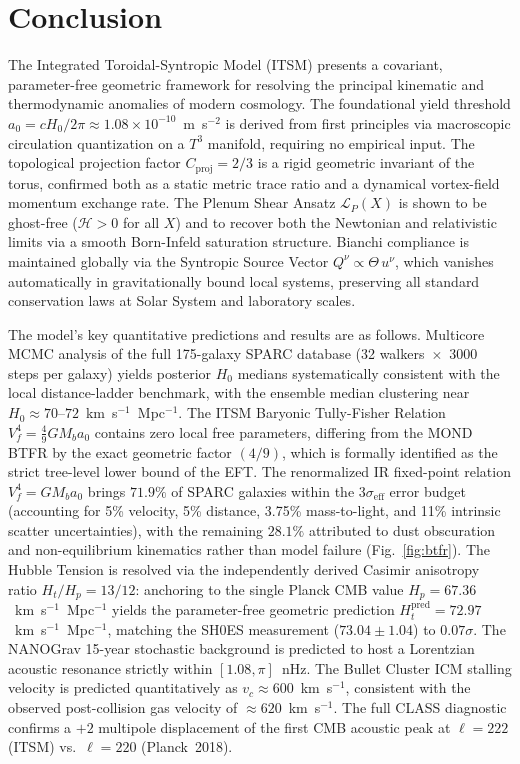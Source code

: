 \documentclass[aps,prd,10pt,twocolumn,superscriptaddress,nofootinbib,floatfix]{revtex4-2}
\begin{document}
\section{Conclusion}

The Integrated Toroidal-Syntropic Model (ITSM) presents a covariant, parameter-free geometric framework for resolving the principal kinematic and thermodynamic anomalies of modern cosmology. The foundational yield threshold $a_0 = cH_0/2\pi \approx 1.08 \times 10^{-10}$~m~s$^{-2}$ is derived from first principles via macroscopic circulation quantization on a $T^3$ manifold, requiring no empirical input. The topological projection factor $C_{\text{proj}} = 2/3$ is a rigid geometric invariant of the torus, confirmed both as a static metric trace ratio and a dynamical vortex-field momentum exchange rate. The Plenum Shear Ansatz $\mathcal{L}_P(X)$ is shown to be ghost-free ($\mathcal{H} > 0$ for all $X$) and to recover both the Newtonian and relativistic limits via a smooth Born-Infeld saturation structure. Bianchi compliance is maintained globally via the Syntropic Source Vector $Q^\nu \propto \Theta\,u^\nu$, which vanishes automatically in gravitationally bound local systems, preserving all standard conservation laws at Solar System and laboratory scales.

The model's key quantitative predictions and results are as follows. Multicore MCMC analysis of the full 175-galaxy SPARC database (32 walkers~$\times$~3000 steps per galaxy) yields posterior $H_0$ medians systematically consistent with the local distance-ladder benchmark, with the ensemble median clustering near $H_0 \approx 70$--$72$~km~s$^{-1}$~Mpc$^{-1}$. The ITSM Baryonic Tully-Fisher Relation $V_f^4 = \frac{4}{9}G M_b a_0$ contains zero local free parameters, differing from the MOND BTFR by the exact geometric factor $(4/9)$, which is formally identified as the strict tree-level lower bound of the EFT. The renormalized IR fixed-point relation $V_f^4 = G M_b a_0$ brings $71.9\%$ of SPARC galaxies within the $3\sigma_{\text{eff}}$ error budget (accounting for 5\% velocity, 5\% distance, 3.75\% mass-to-light, and 11\% intrinsic scatter uncertainties), with the remaining $28.1\%$ attributed to dust obscuration and non-equilibrium kinematics rather than model failure (Fig.~\ref{fig:btfr}). The Hubble Tension is resolved via the independently derived Casimir anisotropy ratio $H_t/H_p = 13/12$: anchoring to the single Planck CMB value $H_p = 67.36$~km~s$^{-1}$~Mpc$^{-1}$ yields the parameter-free geometric prediction $H_t^{\text{pred}} = 72.97$~km~s$^{-1}$~Mpc$^{-1}$, matching the SH0ES measurement ($73.04 \pm 1.04$) to $0.07\sigma$. The NANOGrav 15-year stochastic background is predicted to host a Lorentzian acoustic resonance strictly within $[1.08, \pi]$~nHz. The Bullet Cluster ICM stalling velocity is predicted quantitatively as $v_c \approx 600$~km~s$^{-1}$, consistent with the observed post-collision gas velocity of $\approx 620$~km~s$^{-1}$. The full CLASS diagnostic confirms a $+2$ multipole displacement of the first CMB acoustic peak at $\ell = 222$ (ITSM) vs.~$\ell = 220$ (Planck~2018).
\end{document}
